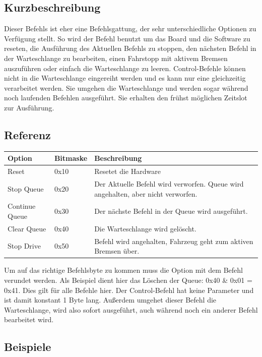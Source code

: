 \documentclass[a4paper]{article}
\begin{document}
	\subsection{Kurzbeschreibung}

	Dieser Befehls ist eher eine Befehlsgattung, der sehr unterschiedliche Optionen zu Verfügung stellt. So wird der
	Befehl benutzt um das Board und die Software zu reseten, die Ausführung des Aktuellen Befehls zu stoppen, den
	nächsten Befehl in der Warteschlange zu bearbeiten, einen Fahrstopp mit aktivem Bremsen auszuführen oder einfach die
	Warteschlange zu leeren. 
	Control-Befehle können nicht in die Warteschlange eingereiht werden und es kann nur eine gleichzeitig verarbeitet werden.
	Sie umgehen die Warteschlange und werden sogar während noch laufenden Befehlen ausgeführt. Sie erhalten den frühst
	möglichen Zeitslot zur Ausführung.

	\subsection{Referenz}

	\begin{tabularx}{\linewidth}{|l|l|X|}
		\hline
		\textbf{Option} & \textbf{Bitmaske} & \textbf{Beschreibung} \\
		\hline
		\hline
		Reset 			& 0x10 				& Resetet die Hardware \\
		\hline
		Stop Queue		& 0x20				& Der Aktuelle Befehl wird verworfen. Queue wird angehalten, aber nicht verworfen. \\
		\hline
		Continue Queue	& 0x30				& Der nächste Befehl in der Queue wird ausgeführt. \\
		\hline
		Clear Queue		& 0x40				& Die Warteschlange wird gelöscht. \\
		\hline
		Stop Drive		& 0x50				& Befehl wird angehalten, Fahrzeug geht zum aktiven Bremsen über. \\
		\hline
	\end{tabularx}

	Um auf das richtige Befehlsbyte zu kommen muss die Option mit dem Befehl verundet werden. Als Beispiel dient hier das Löschen
	der Queue: 0x40 \& 0x01 = 0x41. Dies gilt für alle Befehle hier.
	Der Control-Befehl hat keine Parameter und ist damit konstant 1 Byte lang. Außerdem umgehet dieser Befehl die Warteschlange,
	wird also sofort ausgeführt, auch während noch ein anderer Befehl bearbeitet wird.

	\subsection{Beispiele}
\end{document}

